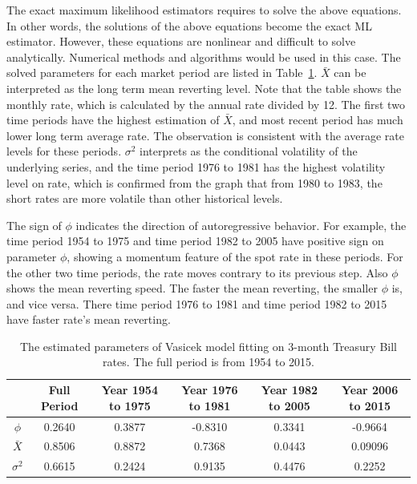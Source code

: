 \documentclass[11pt,reqno,final]{amsart}
\begin{document}
The exact maximum likelihood estimators requires to solve the above equations. In other words, the solutions of the above equations become the exact ML estimator. However, these equations are nonlinear and difficult to solve analytically. Numerical methods and algorithms would be used in this case. The solved parameters for each market period are listed in Table~\ref{tbl::est_params}. $\bar{X}$ can be interpreted as the long term mean reverting level. Note that the table shows the monthly rate, which is calculated by the annual rate divided by 12. The first two time periods have the highest estimation of $\bar{X}$, and most recent period has much lower long term average rate. The observation is consistent with the average rate levels for these periods. $\sigma^2$ interprets as the conditional volatility of the underlying series, and the time period 1976 to 1981 has the highest volatility level on rate, which is confirmed from the graph that from 1980 to 1983, the short rates are more volatile than other historical levels.

The sign of $\phi$ indicates the direction of autoregressive behavior. For example, the time period 1954 to 1975 and time period 1982 to 2005 have positive sign on parameter $\phi$, showing a momentum feature of the spot rate in these periods. For the other two time periods, the rate moves contrary to its previous step. Also $\phi$ shows the mean reverting speed. The faster the mean reverting, the smaller $\phi$ is, and vice versa. There time period 1976 to 1981 and time period 1982 to 2015 have faster rate's mean reverting. 

\begin{table}[H]
\begin{center}
\caption{The estimated parameters of Vasicek model fitting on 3-month Treasury Bill rates. The full period is from 1954 to 2015.}
\begin{tabular}{c|c|c|c|c|c}
  \hline \hline
	&	Full Period	&	Year 1954 to 1975	&	Year 1976 to 1981	&	Year 1982 to 2005	&	Year 2006 to 2015	\\ \hline
$\phi$	&	0.2640	&	0.3877	&	-0.8310	&	0.3341	&	-0.9664	\\
$\bar{X}$	&	0.8506	&	0.8872	&	0.7368	&	0.0443	&	0.09096	\\
$\sigma^2$	&	0.6615	&	0.2424	&	0.9135	&	0.4476	&	0.2252	\\
  \hline\hline
\end{tabular}\label{tbl::est_params}
\end{center}
\end{table}
\end{document}
